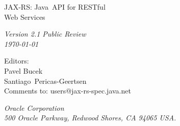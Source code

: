 \begin{titlepage}
\raggedleft

\vspace*{60pt}

{\Huge
\textsf{JAX-RS: Java\texttrademark\ API for RESTful\\\vspace{10pt}
 Web Services}}

\vspace{20pt}

{
\Large\textit{Version 2.1 Public Review\\
\today}
}

\vspace{40pt}

{\large Editors:\\
Pavel Bucek\\
Santiago\ Pericas-Geertsen\\
\vspace{10pt}Comments to: users@jax-rs-spec.java.net
}

\vspace{80pt}

{\small\textit{Oracle Corporation\\
500 Oracle Parkway, Redwood Shores, CA 94065 USA.}
}
\end{titlepage} 
